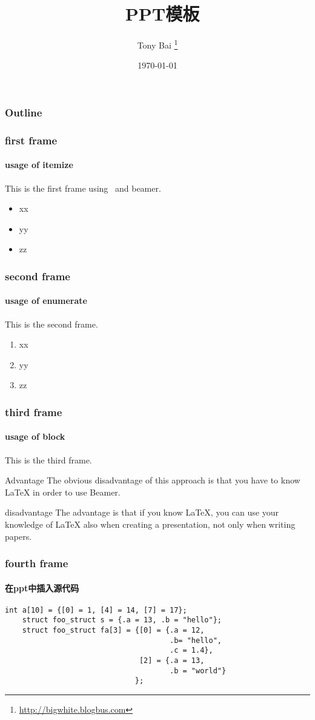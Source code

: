 \documentclass{beamer}
\title{\XeTeX~PPT模板}
\author{Tony Bai \footnote{\url{http://bigwhite.blogbus.com}}}
\date{\today}
\begin{document}
\begin{frame}
\titlepage
\end{frame}

\begin{frame}
\frametitle{Outline}
\tableofcontents
\end{frame}

\begin{frame}
\frametitle{first frame}
\framesubtitle{usage of itemize}
    This is the first frame using \XeTeX~and beamer.
    \begin{itemize}
        \item<1-> xx
        \item<2-> yy
        \item<3-> zz
    \end{itemize}
\end{frame}

\begin{frame}
\frametitle{second frame}
\framesubtitle{usage of enumerate}
    This is the second frame.
    \begin{enumerate}
        \item<1-> xx
        \item<2-> yy
        \item<3-> zz
    \end{enumerate}
\end{frame}

\begin{frame}
\frametitle{third frame}
\framesubtitle{usage of block}
    This is the third frame.
    \begin{block}{Advantage}
        The obvious disadvantage of this approach is that you have to know LaTeX in order to use Beamer. 
    \end{block}
    \begin{block}{disadvantage}
        The advantage is that if you know LaTeX, you can use your knowledge of LaTeX also when creating a presentation, not only when writing papers.
    \end{block}
\end{frame}

\begin{frame}[fragile]
\frametitle{fourth frame}
\framesubtitle{在ppt中插入源代码}
\begin{center}
\begin{lstlisting}[caption={An Example}]
    int a[10] = {[0] = 1, [4] = 14, [7] = 17};
    struct foo_struct s = {.a = 13, .b = "hello"};
    struct foo_struct fa[3] = {[0] = {.a = 12,
                                      .b= "hello", 
                                      .c = 1.4},
                               [2] = {.a = 13, 
                                      .b = "world"}
                              };
\end{lstlisting}
\end{center}
\end{frame}
\end{document}
